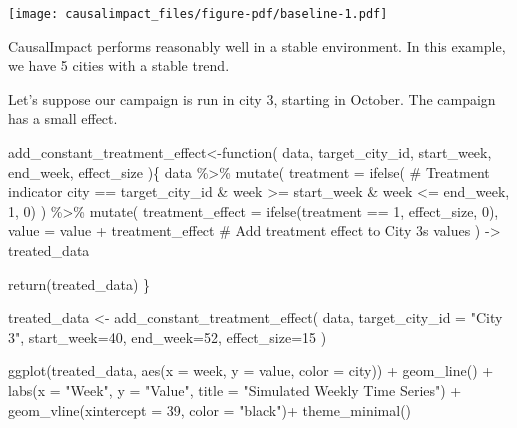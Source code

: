 \documentclass[
  letterpaper,
  DIV=11,
  numbers=noendperiod]{scrreprt}
\newenvironment{Shaded}{\begin{snugshade}}{\end{snugshade}}
\newcommand{\AttributeTok}[1]{\textcolor[rgb]{0.40,0.45,0.13}{#1}}
\newcommand{\CommentTok}[1]{\textcolor[rgb]{0.37,0.37,0.37}{#1}}
\newcommand{\ControlFlowTok}[1]{\textcolor[rgb]{0.00,0.23,0.31}{#1}}
\newcommand{\DecValTok}[1]{\textcolor[rgb]{0.68,0.00,0.00}{#1}}
\newcommand{\FunctionTok}[1]{\textcolor[rgb]{0.28,0.35,0.67}{#1}}
\newcommand{\NormalTok}[1]{\textcolor[rgb]{0.00,0.23,0.31}{#1}}
\newcommand{\OtherTok}[1]{\textcolor[rgb]{0.00,0.23,0.31}{#1}}
\newcommand{\SpecialCharTok}[1]{\textcolor[rgb]{0.37,0.37,0.37}{#1}}
\newcommand{\StringTok}[1]{\textcolor[rgb]{0.13,0.47,0.30}{#1}}
\newcommand*\circled[1]{\tikz[baseline=(char.base)]{
          \node[shape=circle,draw,inner sep=1pt] (char) {{\scriptsize#1}};}}
\begin{document}
\texttt{[image: causalimpact\_files/figure-pdf/baseline-1.pdf]}

CausalImpact performs reasonably well in a stable environment. In this
example, we have 5 cities with a stable trend.

Let's suppose our campaign is run in city 3, starting in October. The
campaign has a small effect.

\label{annotated-cell-28}%
\begin{Shaded}
\begin{Highlighting}[]
\NormalTok{add\_constant\_treatment\_effect}\OtherTok{\textless{}{-}}\ControlFlowTok{function}\NormalTok{(}
\NormalTok{    data,}
\NormalTok{    target\_city\_id,}
\NormalTok{    start\_week,}
\NormalTok{    end\_week,}
\NormalTok{    effect\_size}
\NormalTok{)\{}
\NormalTok{  data }\SpecialCharTok{\%\textgreater{}\%}
  \FunctionTok{mutate}\NormalTok{(}
    \AttributeTok{treatment =} \FunctionTok{ifelse}\NormalTok{( }\CommentTok{\# Treatment indicator}
\NormalTok{      city }\SpecialCharTok{==}\NormalTok{ target\_city\_id }\SpecialCharTok{\&}\NormalTok{ week }\SpecialCharTok{\textgreater{}=}\NormalTok{ start\_week }\SpecialCharTok{\&}\NormalTok{ week }\SpecialCharTok{\textless{}=}\NormalTok{ end\_week, }\DecValTok{1}\NormalTok{, }\DecValTok{0}\NormalTok{)}
\NormalTok{  ) }\SpecialCharTok{\%\textgreater{}\%}
  \FunctionTok{mutate}\NormalTok{(}
    \AttributeTok{treatment\_effect =} \FunctionTok{ifelse}\NormalTok{(treatment }\SpecialCharTok{==} \DecValTok{1}\NormalTok{, effect\_size, }\DecValTok{0}\NormalTok{), }\hspace*{\fill}\NormalTok{\circled{1}}
    \AttributeTok{value =}\NormalTok{ value }\SpecialCharTok{+}\NormalTok{ treatment\_effect       }\CommentTok{\# Add treatment effect to City 3\textquotesingle{}s values}
\NormalTok{  ) }\OtherTok{{-}\textgreater{}}\NormalTok{ treated\_data}

  \FunctionTok{return}\NormalTok{(treated\_data)}
\NormalTok{\}}

\NormalTok{treated\_data }\OtherTok{\textless{}{-}} \FunctionTok{add\_constant\_treatment\_effect}\NormalTok{(}
\NormalTok{  data,}
  \AttributeTok{target\_city\_id =} \StringTok{"City 3"}\NormalTok{,}
  \AttributeTok{start\_week=}\DecValTok{40}\NormalTok{,}
  \AttributeTok{end\_week=}\DecValTok{52}\NormalTok{,}
  \AttributeTok{effect\_size=}\DecValTok{15} 
\NormalTok{)}

\FunctionTok{ggplot}\NormalTok{(treated\_data, }\FunctionTok{aes}\NormalTok{(}\AttributeTok{x =}\NormalTok{ week, }\AttributeTok{y =}\NormalTok{ value, }\AttributeTok{color =}\NormalTok{ city)) }\SpecialCharTok{+}
  \FunctionTok{geom\_line}\NormalTok{() }\SpecialCharTok{+}
  \FunctionTok{labs}\NormalTok{(}\AttributeTok{x =} \StringTok{"Week"}\NormalTok{, }\AttributeTok{y =} \StringTok{"Value"}\NormalTok{, }\AttributeTok{title =} \StringTok{"Simulated Weekly Time Series"}\NormalTok{) }\SpecialCharTok{+}
  \FunctionTok{geom\_vline}\NormalTok{(}\AttributeTok{xintercept =} \DecValTok{39}\NormalTok{, }\AttributeTok{color =} \StringTok{"black"}\NormalTok{)}\SpecialCharTok{+}
  \FunctionTok{theme\_minimal}\NormalTok{()}
\end{Highlighting}
\end{Shaded}
\end{document}

